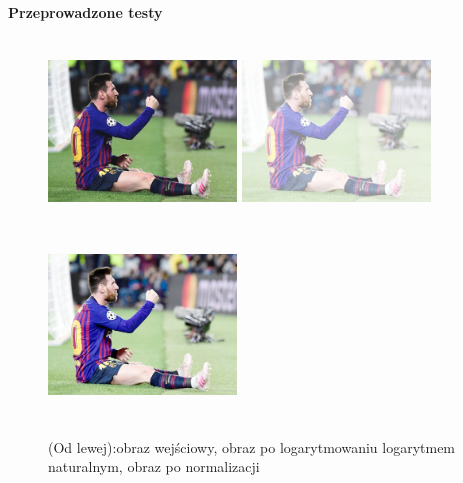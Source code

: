 \documentclass[magisterska,openany]{pracadypl}
\begin{document}
\vspace{0.25cm}\textbf{\Large Przeprowadzone testy}
\vspace{0.5cm}
\begin{figure}[h]
\centering
\includegraphics[width=5cm, height=5cm]{orgi/RGBMessi.jpg}
\includegraphics[width=5cm, height=5cm]{4_10/logRGB1.jpg}
\includegraphics[width=5cm, height=5cm]{4_10/nlogRGB1.jpg}
\caption{(Od lewej):obraz wejściowy, obraz po logarytmowaniu logarytmem
naturalnym, obraz po normalizacji}
\end{figure}
\end{document}

